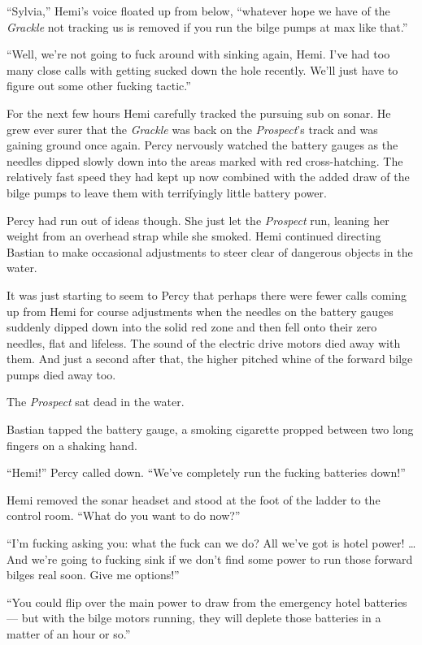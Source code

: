 \documentclass[
]{scrbook}
\begin{document}
``Sylvia,'' Hemi's voice floated up from below, ``whatever hope we have
of the \emph{Grackle} not tracking us is removed if you run the bilge
pumps at max like that.''

``Well, we're not going to fuck around with sinking again, Hemi. I've
had too many close calls with getting sucked down the hole recently.
We'll just have to figure out some other fucking tactic.''

For the next few hours Hemi carefully tracked the pursuing sub on sonar.
He grew ever surer that the \emph{Grackle} was back on the
\emph{Prospect}'s track and was gaining ground once again. Percy
nervously watched the battery gauges as the needles dipped slowly down
into the areas marked with red cross-hatching. The relatively fast speed
they had kept up now combined with the added draw of the bilge pumps to
leave them with terrifyingly little battery power.

Percy had run out of ideas though. She just let the \emph{Prospect} run,
leaning her weight from an overhead strap while she smoked. Hemi
continued directing Bastian to make occasional adjustments to steer
clear of dangerous objects in the water.

It was just starting to seem to Percy that perhaps there were fewer
calls coming up from Hemi for course adjustments when the needles on the
battery gauges suddenly dipped down into the solid red zone and then
fell onto their zero needles, flat and lifeless. The sound of the
electric drive motors died away with them. And just a second after that,
the higher pitched whine of the forward bilge pumps died away too.

The \emph{Prospect} sat dead in the water.

Bastian tapped the battery gauge, a smoking cigarette propped between
two long fingers on a shaking hand.

``Hemi!'' Percy called down. ``We've completely run the fucking
batteries down!''

Hemi removed the sonar headset and stood at the foot of the ladder to
the control room. ``What do you want to do now?''

``I'm fucking asking you: what the fuck can we do? All we've got is
hotel power! \ldots And we're going to fucking sink if we don't find
some power to run those forward bilges real soon. Give me options!''

``You could flip over the main power to draw from the emergency hotel
batteries --- but with the bilge motors running, they will deplete those
batteries in a matter of an hour or so.''
\end{document}
